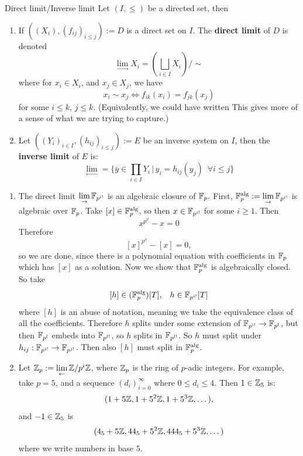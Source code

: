 \documentclass{article}
\begin{document}
\begin{fancydefine}{Direct limit/Inverse limit}
    Let $(I, \leq)$ be a directed set, then \begin{enumerate}
        \item If $((X_{i}), (f_{ij})_{i\leq j}) := D$ is a direct set on $I$. The \textbf{direct limit} of $D$ is denoted \[\lim_{\to} X_{i} = \left(\bigsqcup_{i \in I} X_{i} \right)/ \sim \] where for $x_{i} \in X_{i}$, and $x_{j} \in X_{j}$, we have \[x_{i} \sim x_{j} \Leftrightarrow f_{ik}(x_{i}) = f_{jk}(x_{j})\] for some $i \leq k$, $j \leq k$. (Equivalently, we could have written  This gives more of a sense of what we are trying to capture.) 
        \item Let $((Y_{i})_{i \in I}, (h_{ij})_{i \leq j}) := E$ be an inverse system on $I$, then the \textbf{inverse limit} of $E$ is: \[ \lim_{\leftarrow} = \{ \bar y \in \prod_{i \in I} Y_{i} \, | \, y_{i} = h_{ij}(y_{j}) \,\,\, \forall i \leq j\}  
            \]
    \end{enumerate}    
\end{fancydefine}
\begin{exs*}
    \begin{enumerate}
    \item The direct limit $\lim\limits_{\to} \mathbb{F}_{p^{i!}}$ is an algebraic closure of $\mathbb{F}_{p}.$
    \proof First, $\mathbb{F}_{p}^{\text{alg}} := \lim\limits_{\to} \mathbb{F}_{p^{i!}}$ is algebraic over $\mathbb{F}_{p}$. Take $[x] \in \mathbb{F}_{p}^{\text{alg}}$, so then $x \in \mathbb{F}_{p^{i!}}$ for some $i \geq 1$. Then \[ x^{p^{i!}}-x=0\] Therefore \[ [x]^{p^{i!}} - [x] = 0,\] so we are done, since there is a polynomial equation with coefficients in $\mathbb{F}_{p}$ which has $[x]$ as a solution. \gap Now we show that $\mathbb{F}_{p}^{\text{alg}}$ is algebraically closed. So take \[ [h] \in (\mathbb{F}_{p}^{\text{alg}})[T], \, \,\,\,\, h \in \mathbb{F}_{p^{i!}}[T]\] where $[h]$ is an abuse of notation, meaning we take the equivalence class of all the coefficients. Therefore $h$ splits under some extension of $\mathbb{F}_{p^{i!}} \to \mathbb{F}_{p^{l}}$, but then $\mathbb{F}_{p^{l}}$ embeds into $\mathbb{F}_{p^{l!}}$, so $h$ splits in $\mathbb{F}_{p^{l!}}$. So $h$ must split under $h_{ij}: \mathbb{F}_{p^{i!}} \to \mathbb{F}_{p^{j!}}$. Then also $[h]$ must split in $\mathbb{F}_{p}^{\text{alg}}$.
    \item Let $\mathbb{Z}_{p} := \lim\limits_{\leftarrow} \mathbb{Z}/p^{i}\mathbb{Z}$, where $\mathbb{Z}_{p}$ is the ring of $p$-adic integers. For example, take $p=5$, and a sequence $(d_{i})_{i=0}^{\infty}$ where $0 \leq d_{i} \leq 4$. Then $ 1 \in \mathbb{Z}_{5}$ is: \[ (1+5\mathbb{Z}, 1+5^{2}\mathbb{Z}, 1+ 5^{3}\mathbb{Z}, \dots),\]
    and $-1 \in \mathbb{Z}_{5}$ is \[ (4_{5}+5\mathbb{Z}, 44_{5} + 5^{2}\mathbb{Z}, 444_{5} + 5^{3}\mathbb{Z}, \dots)\] where we write numbers in base $5$.
    \end{enumerate}
\end{exs*}
\end{document}
